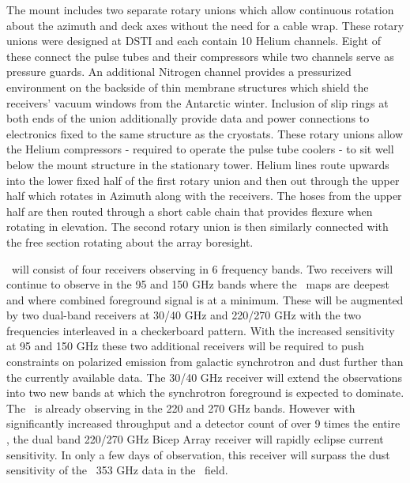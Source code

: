 \documentclass[]{spie}  %
\begin{document}
The \biceparray mount includes two separate rotary unions which allow
continuous rotation about the azimuth and deck axes without the need for a
cable wrap. These rotary unions were designed at DSTI and each contain 10
Helium channels. Eight of these connect the pulse tubes and their compressors
while two channels serve as pressure guards. An additional Nitrogen channel
provides a pressurized environment on the backside of thin membrane
structures which shield the receivers' vacuum windows from the Antarctic winter.
Inclusion of slip rings at both ends of the union additionally provide data and power
connections to electronics fixed to the same structure as the cryostats. These rotary
unions allow the Helium compressors - required to operate the
pulse tube coolers - to sit well below the mount structure in the
stationary tower. Helium lines route upwards into the lower fixed half of the first
rotary union and then out through the upper half which rotates in Azimuth
along with the receivers. The hoses from the upper half are then routed through a
short cable chain that provides flexure when rotating in elevation. The
second rotary union is then similarly connected with the free section rotating
about the array boresight.



\biceparray \ will consist of four receivers observing in 6 frequency bands.
Two receivers will continue to observe in the 95 and 150 GHz bands where the
\bk \ maps are deepest and where combined foreground
signal is at a minimum. These will be augmented by two dual-band receivers at
30/40 GHz and 220/270 GHz with the two frequencies interleaved in a
checkerboard pattern. With the increased sensitivity at 95 and 150 GHz these
two additional receivers will be required to push constraints on polarized
emission from galactic synchrotron and dust further than the currently available data.
The 30/40 GHz receiver will extend the observations into two
new bands at which the synchrotron foreground is expected to dominate. The
\keckarray \ is already observing in the 220 and 270 GHz bands.  However with
significantly increased throughput and a detector count of over 9 times the
entire \keckarray , the dual band 220/270 GHz Bicep Array receiver will rapidly
eclipse current sensitivity. In only a few days of observation,
this receiver will surpass the dust sensitivity of the \planck \ 353 GHz data in
the \bk \ field. 
\end{document}
